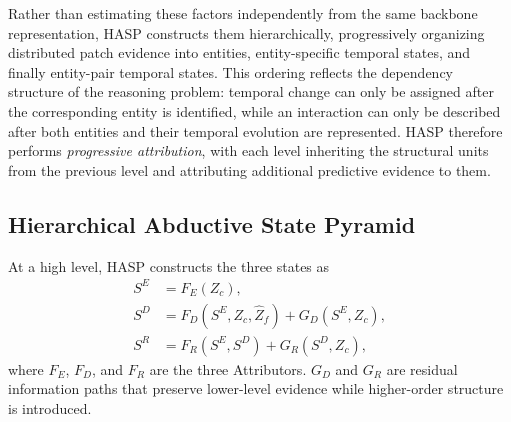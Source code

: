 \documentclass{article}
\begin{document}
Rather than estimating these factors independently from the same backbone representation, HASP constructs them hierarchically, progressively organizing distributed patch evidence into entities, entity-specific temporal states, and finally entity-pair temporal states. This ordering reflects the dependency structure of the reasoning problem: temporal change can only be assigned after the corresponding entity is identified, while an interaction can only be described after both entities and their temporal evolution are represented. HASP therefore performs \emph{progressive attribution}, with each level inheriting the structural units from the previous level and attributing additional predictive evidence to them.



\subsection{Hierarchical Abductive State Pyramid}
At a high level, HASP constructs the three states as
\begin{align}
    S^E
    &= F_E(Z_c), \\
    S^D
    &= F_D(S^E,Z_c,\widehat{Z}_f)
    + G_D(S^E,Z_c), \\
    S^R
    &= F_R(S^E,S^D)
    + G_R(S^D,Z_c),
    \label{eq:hasp}
\end{align}
where $F_E$, $F_D$, and $F_R$ are the three Attributors. $G_D$ and $G_R$ are residual information paths that preserve lower-level evidence while higher-order structure is introduced.
\end{document}
